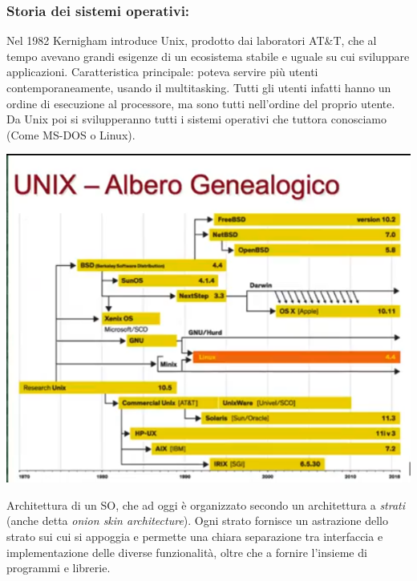 \documentclass[
  paper=a4,
  oneside  ,captions=tableheading
]{scrbook}
\begin{document}
\hypertarget{storia-dei-sistemi-operativi}{%
\subsubsection{Storia dei sistemi
operativi:}\label{storia-dei-sistemi-operativi}}

Nel 1982 Kernigham introduce Unix, prodotto dai laboratori AT\&T, che al
tempo avevano grandi esigenze di un ecosistema stabile e uguale su cui
sviluppare applicazioni. Caratteristica principale: poteva servire più
utenti contemporaneamente, usando il multitasking. Tutti gli utenti
infatti hanno un ordine di esecuzione al processore, ma sono tutti
nell'ordine del proprio utente. Da Unix poi si svilupperanno tutti i
sistemi operativi che tuttora conosciamo (Come MS-DOS o Linux).

\includegraphics{./image/image-20200930171019756.png}

Architettura di un SO, che ad oggi è organizzato secondo un architettura
a \emph{strati} (anche detta \emph{onion skin architecture}). Ogni
strato fornisce un astrazione dello strato sui cui si appoggia e
permette una chiara separazione tra interfaccia e implementazione delle
diverse funzionalità, oltre che a fornire l'insieme di programmi e
librerie.
\end{document}
